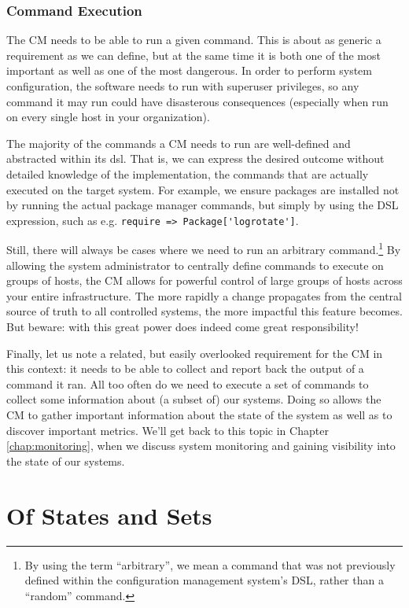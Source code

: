 \subsubsection*{Command Execution}

The CM needs to be able to run a given command.  This
is about as generic a requirement as we can define,
but at the same time it is both one of the most
important as well as one of the most dangerous.  In
order to perform system configuration, the software
needs to run with superuser privileges, so any command
it may run could have disasterous consequences
(especially when run on every single host in your
organization).

The majority of the commands a CM needs to run are
well-defined and abstracted within its \gls{dsl}.
That is, we can express the desired outcome without
detailed knowledge of the implementation, the commands
that are actually executed on the target system.  For
example, we ensure packages are installed not by
running the actual package manager commands, but
simply by using the DSL expression, such as e.g.
\verb+require => Package['logrotate']+.

Still, there will always be cases where we need to run
an arbitrary command.\footnote{By using the term
``arbitrary'', we mean a command that was not
previously defined within the configuration management
system's DSL, rather than a ``random'' command.}  By
allowing the system administrator to centrally define
commands to execute on groups of hosts, the CM allows
for powerful control of large groups of hosts across
your entire infrastructure.  The more rapidly a change
propagates from the central source of truth to all
controlled systems, the more impactful this feature
becomes.  But beware: with this great power does
indeed come great responsibility!

Finally, let us note a related, but easily overlooked
requirement for the CM in this context: it needs to be
able to collect and report back the output of a
command it ran.  All too often do we need to execute a
set of commands to collect some information about (a
subset of) our systems.  Doing so allows the CM to
gather important information about the state of the
system as well as to discover important metrics.
We'll get back to this topic in Chapter
\ref{chap:monitoring}, when we discuss system
monitoring and gaining visibility into the state of
our systems.

\section{Of States and Sets}

